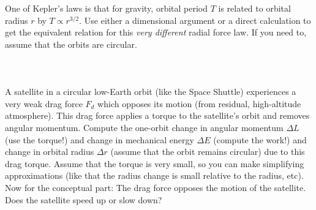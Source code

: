 \documentclass[12pt]{article}
\newcounter{problem}
\begin{document}
One of Kepler's laws is that for gravity, orbital period $T$ is
related to orbital radius $r$ by $T\propto r^{3/2}$.  Use either a
dimensional argument or a direct calculation to get the equivalent
relation for this \emph{very different} radial force law.  If you need
to, assume that the orbits are circular.

\paragraph{\problemname~\theproblem}

A satellite in a circular low-Earth orbit (like the Space Shuttle)
experiences a very weak drag force $F_d$ which opposes its motion
(from residual, high-altitude atmosphere).  This drag force applies a
torque to the satellite's orbit and removes angular momentum.  Compute
the one-orbit change in angular momentum $\Delta L$ (use the torque!)
and change in mechanical energy $\Delta E$ (compute the work!) and
change in orbital radius $\Delta r$ (assume that the orbit remains
circular) due to this drag torque.  Assume that the torque is very
small, so you can make simplifying approximations (like that the
radius change is small relative to the radius, etc).  Now for the
conceptual part: The drag force opposes the motion of the satellite.
Does the satellite speed up or slow down?
\end{document}
